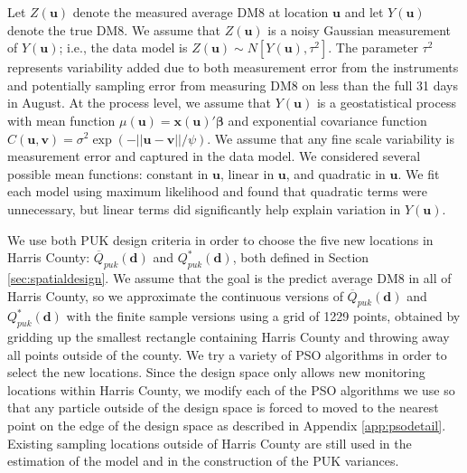 \documentclass[cmbright]{staauth}
\begin{document}
Let $Z(\bm{u})$ denote the measured average DM8 at location $\bm{u}$ and let $Y(\bm{u})$ denote the true DM8. We assume that $Z(\bm{u})$ is a noisy Gaussian measurement of $Y(\bm{u})$; i.e., the data model is $Z(\bm{u}) \sim N[Y(\bm{u}), \tau^2]$. The parameter $\tau^2$ represents variability added due to both measurement error from the instruments and potentially sampling error from measuring DM8 on less than the full 31 days in August. At the process level, we assume that $Y(\bm{u})$ is a geostatistical process with mean function $\mu(\bm{u}) = \bm{x}(\bm{u})'\bm{\beta}$ and exponential covariance function $C(\bm{u},\bm{v}) = \sigma^2\exp(-||\bm{u} - \bm{v}||/\psi)$. We assume that any fine scale variability is measurement error and captured in the data model. We considered several possible mean functions: constant in $\bm{u}$, linear in $\bm{u}$, and quadratic in $\bm{u}$. We fit each model using maximum likelihood and found that quadratic terms were unnecessary, but linear terms did significantly help explain variation in $Y(\bm{u})$.

We use both PUK design criteria in order to choose the five new locations in Harris County: $\overline{Q}_{puk}(\bm{d})$ and $Q^*_{puk}(\bm{d})$, both defined in Section \ref{sec:spatialdesign}. We assume that the goal is the predict average DM8 in all of Harris County, so we approximate the continuous versions of $\overline{Q}_{puk}(\bm{d})$ and $Q^*_{puk}(\bm{d})$ with the finite sample versions using a grid of 1229 points, obtained by gridding up the smallest rectangle containing Harris County and throwing away all points outside of the county. We try a variety of PSO algorithms in order to select the new locations. Since the design space only allows new monitoring locations within Harris County, we modify each of the PSO algorithms we use so that any particle outside of the design space is forced to moved to the nearest point on the edge of the design space as described in Appendix \ref{app:psodetail}. Existing sampling locations outside of Harris County are still used in the estimation of the model and in the construction of the PUK variances.
\end{document}
